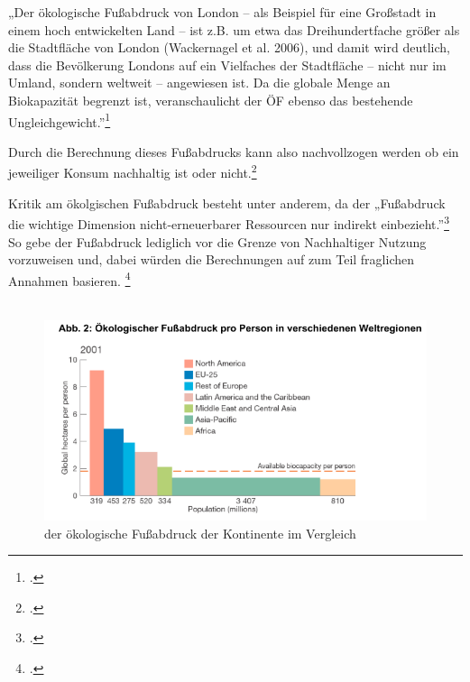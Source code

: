 \documentclass{scrartcl}
\begin{document}
\begin{displayquote}
„Der ökologische Fußabdruck von London – als Beispiel für eine Großstadt in einem hoch entwickelten Land – ist z.B. um etwa das Dreihundertfache größer als die Stadtfläche von London (Wackernagel et al. 2006), und damit wird deutlich, dass die Bevölkerung Londons auf ein Vielfaches der Stadtfläche – nicht nur im Umland, sondern weltweit – angewiesen ist. Da die globale Menge an Biokapazität begrenzt ist, veranschaulicht der ÖF ebenso das bestehende Ungleichgewicht.”\footcite{AntjeFlade2015StadtStadtforschung, S.192}
\end{displayquote} 

Durch die Berechnung dieses Fußabdrucks kann also nachvollzogen werden ob ein jeweiliger Konsum nachhaltig ist oder nicht.\footcite[S.192]{AntjeFlade2015StadtStadtforschung}

Kritik am ökolgischen Fußabdruck besteht unter anderem, da der „Fußabdruck die wichtige Dimension nicht-erneuerbarer Ressourcen nur indirekt einbezieht.”\footcite[S.3]{StefanGiljum2007WissenschaftlicheFuabdruck} So gebe der Fußabdruck lediglich vor die Grenze von Nachhaltiger Nutzung vorzuweisen und, dabei würden die Berechnungen auf zum Teil fraglichen Annahmen basieren. \footcite[Vgl.][S.3f]{StefanGiljum2007WissenschaftlicheFuabdruck}
\\
\\


\begin{figure}[htbp]
\centering
\includegraphics[width=12cm]{image_folder/oekFussabdruckWelt.png}
\caption{der ökologische Fußabdruck der Kontinente im Vergleich}
\label{fig:oekFussabdruckWelt}
\end{figure}
\end{document}
